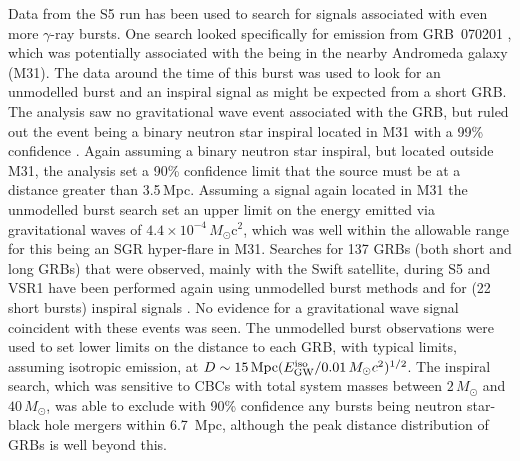 \documentclass{article}
\begin{document}
Data from the S5 run has been used to search for signals associated with even more
$\gamma$-ray bursts. One search looked specifically for emission from
GRB~070201 \cite{Golenetskii:2007a, Golenetskii:2007b}, which
was potentially associated with the being in the nearby Andromeda galaxy
(M31). The data around the time of this burst was used to look for an
unmodelled burst and an inspiral signal as might be expected from a short GRB.
The analysis saw no gravitational wave event associated with the GRB, but
ruled out the event being a binary neutron star inspiral located in M31 with a
99\% confidence \cite{Abbott:2008g}. Again assuming a binary neutron star
inspiral, but located outside M31, the analysis set a 90\% confidence
limit that the source must be at a distance greater than 3.5\,Mpc. 
Assuming a signal again located in M31 the unmodelled burst search set an upper 
limit on the energy
emitted via gravitational waves of $4.4\times10^{-4}\,M_{\odot}$c$^2$, which was 
well within the allowable range for this being an SGR hyper-flare in M31. Searches for 137
GRBs (both short and long GRBs) that were observed, mainly with the Swift
satellite, during S5 and VSR1 have been performed again using unmodelled 
burst methods \cite{Abbott:2009d} and for (22 short bursts) inspiral 
signals \cite{Abadie:2010b}. No evidence for a gravitational wave signal 
coincident with these events was seen.
The unmodelled burst observations were used to set lower limits on the 
distance to each GRB, with typical limits, assuming isotropic emission, 
at $D\sim15\,{\rm Mpc}(E^{\rm iso}_{\rm GW}/0.01\,M_{\odot}c^2)^{1/2}$. The 
inspiral search, which was sensitive to CBCs with total system masses between
$2\,M_{\odot}$ and $40\,M_{\odot}$, was able to exclude with 90\% confidence 
any bursts being neutron star-black hole mergers within 6.7~Mpc, although the
peak distance distribution of GRBs is well beyond this.
\end{document}
